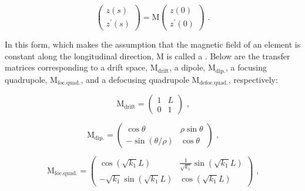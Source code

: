 \begin{equation}
    \left(
        \begin{array}{c}
            z(s) \\
            z^{\prime}(s)
        \end{array} \right) = \mathrm{M} \left( 
        \begin{array}{c}
            z(0) \\
            z^{\prime}(0)
    \end{array} \right) \text{ .}
    \label{equation:hill_solution_matrix}
\end{equation}

In this form, which makes the assumption that the magnetic field of an element is constant along the longitudinal direction, M is called a . 
Below are the transfer matrices corresponding to a drift space, \(\mathrm{M_{drift}}\), a dipole, \(\mathrm{M_{dip.}}\), a focusing quadrupole, \(\mathrm{M_{foc. quad.}}\), and a defocusing quadrupole \(\mathrm{M_{defoc. quad.}}\), respectively:

\begin{equation}
    \mathrm{M_{drift}} = \left(
        \begin{array}{ll}
            1 & L \\
            0 & 1
    \end{array} \right) \text{ ,}
    \label{equation:drift_transfer_matrix}
\end{equation}

\begin{equation}
    \mathrm{M_{dip.}} = \left(
        \begin{array}{cc}
            \cos \theta                          & \rho \sin \theta \\
            - \sin \left( \theta / \rho \right)  & \cos \theta
    \end{array} \right) \text{ ,}
    \label{equation:dipole_transfer_matrix}
\end{equation}

\begin{equation}
    \mathrm{M_{foc. quad.}} = \left(
        \begin{array}{cc}
            \cos \left( \sqrt{k_1} L \right)             & \frac{1}{\sqrt{k_1}} \sin \left( \sqrt{k_1} L \right) \\
            -\sqrt{k_1} \sin \left( \sqrt{k_1} L \right) & \cos \left( \sqrt{k_1} L \right)
    \end{array} \right) \text{ ,}
    \label{equation:focusing_quad_transfer_matrix}
\end{equation}

